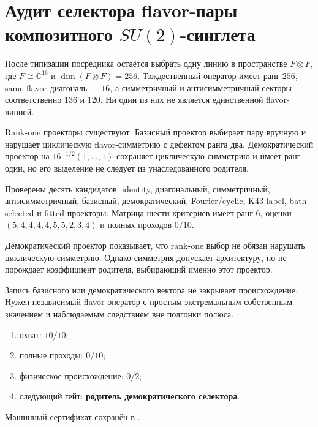 \chapter{Аудит селектора flavor-пары композитного
\texorpdfstring{$SU(2)$}{SU(2)}-синглета}
\label{ch:v10-discrete-resolution-su2-flavor-selector}

После типизации посредника остаётся выбрать одну линию в пространстве
$F\otimes F$, где $F\cong\mathbb C^{16}$ и $\dim(F\otimes F)=256$.
Тождественный оператор имеет ранг $256$, same-flavor диагональ --- $16$,
а симметричный и антисимметричный секторы --- соответственно $136$ и $120$.
Ни один из них не является единственной flavor-линией.

Rank-one проекторы существуют. Базисный проектор выбирает пару вручную и
нарушает циклическую flavor-симметрию с дефектом ранга два. Демократический
проектор на $16^{-1/2}(1,\ldots,1)$ сохраняет циклическую симметрию и имеет
ранг один, но его выделение не следует из унаследованного родителя.

Проверены десять кандидатов: identity, диагональный, симметричный,
антисимметричный, базисный, демократический, Fourier/cyclic, K43-label,
bath-selected и fitted-проекторы. Матрица шести критериев имеет ранг $6$,
оценки $(5,4,4,4,4,5,5,2,3,4)$ и полных проходов $0/10$.

\begin{theorem}
Демократический проектор показывает, что rank-one выбор не обязан нарушать
циклическую симметрию. Однако симметрия допускает архитектуру, но не
порождает коэффициент родителя, выбирающий именно этот проектор.
\end{theorem}
\begin{nogocriterion}
Запись базисного или демократического вектора не закрывает происхождение.
Нужен независимый flavor-оператор с простым экстремальным собственным
значением и наблюдаемым следствием вне подгонки полюса.
\end{nogocriterion}
\begin{protocol}\begin{enumerate}
\item охват: \textbf{$10/10$};
\item полные проходы: \textbf{$0/10$};
\item физическое происхождение: \textbf{$0/2$};
\item следующий гейт: \textbf{родитель демократического селектора}.
\end{enumerate}\end{protocol}
Машинный сертификат сохранён в
.